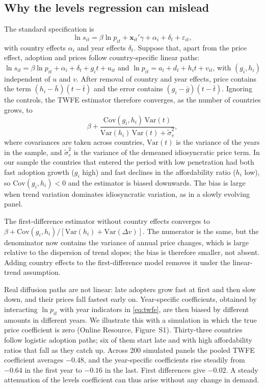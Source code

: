 \documentclass[pdflatex,sn-basic]{sn-jnl}
\begin{document}
\subsection{Why the levels regression can mislead}

The standard specification is
\begin{equation}\label{eq:twfe}
\ln s_{it} = \beta \ln p_{it} + \mathbf{x}_{it}'\gamma + \alpha_i + \delta_t + \varepsilon_{it},
\end{equation}
with country effects $\alpha_i$ and year effects $\delta_t$. Suppose that, apart from the price effect, adoption and prices follow country-specific linear paths: $\ln s_{it} = \beta \ln p_{it} + \alpha_i + \delta_t + g_i t + u_{it}$ and $\ln p_{it} = a_i + d_t + h_i t + v_{it}$, with $(g_i,h_i)$ independent of $u$ and $v$. After removal of country and year effects, price contains the term $(h_i-\bar h)(t-\bar t)$ and the error contains $(g_i-\bar g)(t-\bar t)$. Ignoring the controls, the TWFE estimator therefore converges, as the number of countries grows, to
\begin{equation}\label{eq:bias}
\beta + \frac{\mathrm{Cov}(g_i,h_i)\,\mathrm{Var}(t)}{\mathrm{Var}(h_i)\,\mathrm{Var}(t)+\tilde\sigma_v^2},
\end{equation}
where covariances are taken across countries, $\mathrm{Var}(t)$ is the variance of the years in the sample, and $\tilde\sigma_v^2$ is the variance of the demeaned idiosyncratic price term. In our sample the countries that entered the period with low penetration had both fast adoption growth ($g_i$ high) and fast declines in the affordability ratio ($h_i$ low), so $\mathrm{Cov}(g_i,h_i)<0$ and the estimator is biased downwards. The bias is large when trend variation dominates idiosyncratic variation, as in a slowly evolving panel.

The first-difference estimator without country effects converges to $\beta + \mathrm{Cov}(g_i,h_i)/[\mathrm{Var}(h_i)+\mathrm{Var}(\Delta v)]$. The numerator is the same, but the denominator now contains the variance of annual price changes, which is large relative to the dispersion of trend slopes; the bias is therefore smaller, not absent. Adding country effects to the first-difference model removes it under the linear-trend assumption.

Real diffusion paths are not linear: late adopters grow fast at first and then slow down, and their prices fall fastest early on. Year-specific coefficients, obtained by interacting $\ln p_{it}$ with year indicators in \eqref{eq:twfe}, are then biased by different amounts in different years. We illustrate this with a simulation in which the true price coefficient is zero (Online Resource, Figure~S1). Thirty-three countries follow logistic adoption paths; six of them start late and with high affordability ratios that fall as they catch up. Across 200 simulated panels the pooled TWFE coefficient averages $-0.48$, and the year-specific coefficients rise steadily from $-0.64$ in the first year to $-0.16$ in the last. First differences give $-0.02$. A steady attenuation of the levels coefficient can thus arise without any change in demand.
\end{document}

